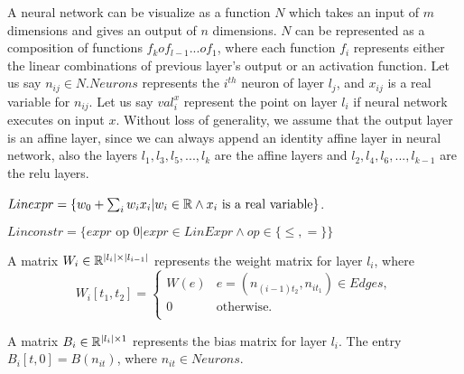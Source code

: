 A neural network can be visualize as a function $N$ which takes an input of $m$ dimensions and gives an 
output of $n$ dimensions. $N$ can be represented as a composition of functions $f_k o f_{l-1} ... o f_1$,
where each function $f_i$ represents either the linear combinations of previous layer's
output or an activation function. Let us say $n_{ij} \in N.Neurons$ represents 
the $i^{th}$ neuron of layer $l_j$, and $x_{ij}$ is a real variable for $n_{ij}$. 
Let us say $val_i^{x}$ represent the point on layer $l_i$ if neural network executes on input $x$. 
Without loss of generality, we assume that the output layer is an affine layer, 
since we can always append an identity affine layer in neural network, also the layers $l_1, l_3, l_5, ..., l_k$ 
are the affine layers and $l_2, l_4, l_6, ..., l_{k-1}$ are the relu layers.  



\begin{df}
    \label{def:linexpr}
    $Linexpr = \{ w_0 + \sum_{i} w_i x_i | w_i \in \mathbb{R} \land x_i \text{ is a real variable} \}$.
\end{df}
  
\begin{df}
    \label{def:linconstr}
    $Linconstr = \{expr \text{ op } 0 | expr \in LinExpr \land op \in \{\leq, = \}\}$
\end{df}






\begin{df}
  A matrix $W_i \in \mathbb{R}^{|l_i|\times|l_{i-1}|}$ represents the weight matrix for layer $l_i$, where  
    $$
    W_i[t_1, t_2] = 
    \begin{cases}
      W(e) & e=(n_{(i-1)t_2}, n_{it_1}) \in Edges,\\
      0 & \text{otherwise.}\\
    \end{cases}
    $$
\end{df}

\begin{df}
    A matrix $B_i \in \mathbb{R}^{|l_i|\times 1}$ represents the bias matrix for layer $l_i$. The entry $B_i[t,0] = B(n_{it})$, where $n_{it} \in Neurons$. 
\end{df}



